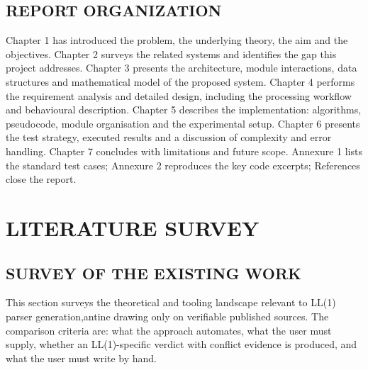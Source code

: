 \documentclass[12pt,a4paper,oneside,openany]{report}
\begin{document}
\section{REPORT ORGANIZATION}
Chapter 1 has introduced the problem, the underlying theory, the aim and
the objectives. Chapter 2 surveys the related systems and identifies the
gap this project addresses. Chapter 3 presents the architecture, module
interactions, data structures and mathematical model of the proposed
system. Chapter 4 performs the requirement analysis and detailed design,
including the processing workflow and behavioural description. Chapter 5
describes the implementation: algorithms, pseudocode, module organisation
and the experimental setup. Chapter 6 presents the test strategy, executed
results and a discussion of complexity and error handling. Chapter 7
concludes with limitations and future scope. Annexure 1 lists the standard
test cases; Annexure 2 reproduces the key code excerpts; References close
the report.






\chapter{LITERATURE SURVEY}
\label{ch:lit}

\section{SURVEY OF THE EXISTING WORK}
This section surveys the theoretical and tooling landscape relevant to LL(1)
parser generation,antine drawing only on verifiable published sources. The
comparison criteria are: what the approach automates, what the user must
supply, whether an LL(1)-specific verdict with conflict evidence is produced,
and what the user must write by hand.
\end{document}
